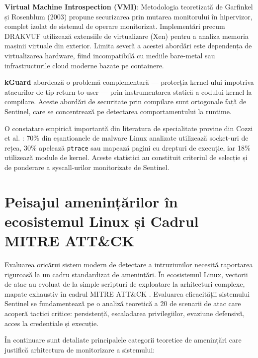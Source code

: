\par \textbf{Virtual Machine Introspection (VMI)}: Metodologia teoretizată de Garfinkel și Rosenblum (2003) \cite{Garfinkel2003} propune securizarea prin mutarea monitorului în hipervizor, complet izolat de sistemul de operare monitorizat. Implementări precum DRAKVUF \cite{Lengyel2014} utilizează extensiile de virtualizare (Xen) pentru a analiza memoria mașinii virtuale din exterior. Limita severă a acestei abordări este dependența de virtualizarea hardware, fiind incompatibilă cu mediile bare-metal sau infrastructurile cloud moderne bazate pe containere.

\par \textbf{kGuard} \cite{Kemerlis2012} abordează o problemă complementară --- protecția kernel-ului împotriva atacurilor de tip return-to-user --- prin instrumentarea statică a codului kernel la compilare. Aceste abordări de securitate prin compilare sunt ortogonale față de Sentinel, care se concentrează pe detectarea comportamentului la runtime.

\par O constatare empirică importantă din literatura de specialitate provine din Cozzi et al. \cite{Cozzi2018}: 70\% din eșantioanele de malware Linux analizate utilizează socket-uri de rețea, 30\% apelează \texttt{ptrace} sau mapează pagini cu drepturi de execuție, iar 18\% utilizează module de kernel. Aceste statistici au constituit criteriul de selecție și de ponderare a syscall-urilor monitorizate de Sentinel.


\section{Peisajul amenințărilor în ecosistemul Linux și Cadrul MITRE ATT\&CK}
\label{sec:threat_landscape}

\par Evaluarea oricărui sistem modern de detectare a intruziunilor necesită raportarea riguroasă la un cadru standardizat de amenințări. În ecosistemul Linux, vectorii de atac au evoluat de la simple scripturi de exploatare la arhitecturi complexe, mapate exhaustiv în cadrul MITRE ATT\&CK \cite{MITRE_ATTCK}. Evaluarea eficacității sistemului Sentinel se fundamentează pe o analiză teoretică a 20 de scenarii de atac care acoperă tactici critice: persistență, escaladarea privilegiilor, evaziune defensivă, acces la credențiale și execuție.

\par În continuare sunt detaliate principalele categorii teoretice de amenințări care justifică arhitectura de monitorizare a sistemului:

